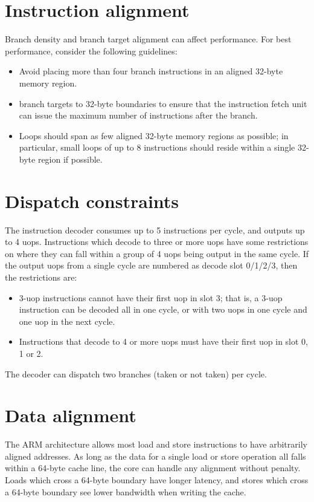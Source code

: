 \documentclass{article}
\begin{document}
\section{Instruction alignment}

Branch density and branch target alignment can affect performance. For
best performance, consider the following guidelines:
\begin{itemize}
\item Avoid placing more than four branch instructions in an aligned
  32-byte memory region.
\item branch targets to 32-byte boundaries to ensure that the
  instruction fetch unit can issue the maximum number of instructions
  after the branch.
\item Loops should span as few aligned 32-byte memory regions as
  possible; in particular, small loops of up to 8 instructions should
  reside within a single 32-byte region if possible.
\end{itemize}

\section{Dispatch constraints}

The instruction decoder consumes up to 5 instructions per cycle, and
outputs up to 4 uops. Instructions which decode to three or more uops
have some restrictions on where they can fall within a group of 4 uops
being output in the same cycle. If the output uops from a single cycle
are numbered as decode slot 0/1/2/3, then the restrictions are:
\begin{itemize}
\item 3-uop instructions cannot have their first uop in slot 3; that
  is, a 3-uop instruction can be decoded all in one cycle, or with two
  uops in one cycle and one uop in the next cycle.
\item Instructions that decode to 4 or more uops must have their first
  uop in slot 0, 1 or 2.
\end{itemize}
The decoder can dispatch two branches (taken or not taken) per cycle.

\section{Data alignment}

The ARM architecture allows most load and store instructions to have
arbitrarily aligned addresses. As long as the data for a single load
or store operation all falls within a 64-byte cache line, the core can
handle any alignment without penalty. Loads which cross a 64-byte
boundary have longer latency, and stores which cross a 64-byte
boundary see lower bandwidth when writing the cache. \\
\end{document}
